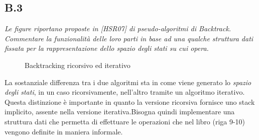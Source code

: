 \documentclass[a4paper]{article}
\begin{document}
\subsection{B.3}
\emph{Le figure riportano proposte in [HSR07] di pseudo-algoritmi di Backtrack. Commentare la funzionalità delle loro parti in base ad una qualche struttura dati fissata per la rappresentazione dello spazio degli stati su cui opera.}
\begin{figure}[!ht]
\centering
{}
\caption{Backtracking ricorsivo ed iterativo} \label{FIG:B3_algorithms}
\end{figure}


La sostanziale differenza tra i due algoritmi sta in come viene generato lo \textit{spazio degli stati}, in un caso ricorsivamente, nell'altro tramite un algoritmo iterativo.\\
Questa distinzione è importante in quanto la versione ricorsiva fornisce uno stack implicito, assente nella versione iterativa.Bisogna quindi implementare una struttura dati che permetta di effettuare le operazioni che nel libro (riga 9-10) vengono definite in maniera informale.
\end{document}
